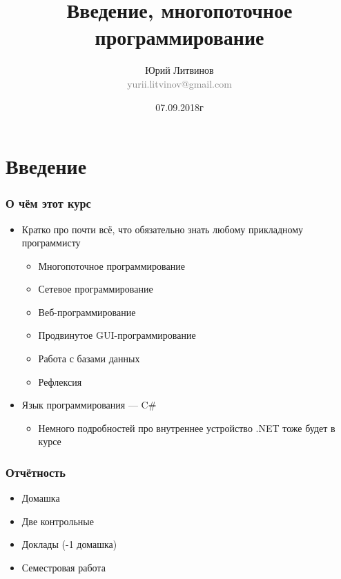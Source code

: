 \documentclass[xetex,mathserif,serif]{beamer}
\title{Введение, многопоточное программирование}
\author[Юрий Литвинов]{Юрий Литвинов\\\small{\textcolor{gray}{yurii.litvinov@gmail.com}}}
\date{07.09.2018г}
\begin{document}
	\frame{\titlepage}

	\section{Введение}

	\begin{frame}
		\frametitle{О чём этот курс}
		\begin{itemize}
			\item Кратко про почти всё, что обязательно знать любому прикладному программисту
			\begin{itemize}
				\item Многопоточное программирование
				\item Сетевое программирование
				\item Веб-программирование
				\item Продвинутое GUI-программирование
				\item Работа с базами данных
				\item Рефлексия
			\end{itemize}
			\item Язык программирования --- C\#
			\begin{itemize}
				\item Немного подробностей про внутреннее устройство .NET тоже будет в курсе
			\end{itemize}
		\end{itemize}
	\end{frame}

	\begin{frame}
		\frametitle{Отчётность}
		\begin{itemize}
			\item Домашка
			\item Две контрольные
			\item Доклады (-1 домашка)
			\item Семестровая работа
		\end{itemize}
	\end{frame}
\end{document}
